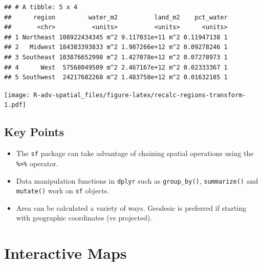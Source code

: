 \documentclass[]{book}
\newenvironment{Shaded}{\begin{snugshade}}{\end{snugshade}}
\newcommand{\KeywordTok}[1]{\textcolor[rgb]{0.13,0.29,0.53}{\textbf{{#1}}}}
\newcommand{\DataTypeTok}[1]{\textcolor[rgb]{0.13,0.29,0.53}{{#1}}}
\newcommand{\StringTok}[1]{\textcolor[rgb]{0.31,0.60,0.02}{{#1}}}
\newcommand{\CommentTok}[1]{\textcolor[rgb]{0.56,0.35,0.01}{\textit{{#1}}}}
\newcommand{\NormalTok}[1]{{#1}}
\providecommand{\tightlist}{%
  \setlength{\itemsep}{0pt}\setlength{\parskip}{0pt}}
\theoremstyle{definition}
\theoremstyle{definition}
\theoremstyle{definition}
\theoremstyle{remark}
\begin{document}
\begin{verbatim}
## # A tibble: 5 x 4
##      region         water_m2          land_m2    pct_water
##       <chr>          <units>          <units>      <units>
## 1 Northeast 108922434345 m^2 9.117031e+11 m^2 0.11947138 1
## 2   Midwest 184383393833 m^2 1.987266e+12 m^2 0.09278246 1
## 3 Southeast 103876652998 m^2 1.427078e+12 m^2 0.07278973 1
## 4      West  57568049509 m^2 2.467167e+12 m^2 0.02333367 1
## 5 Southwest  24217682268 m^2 1.483758e+12 m^2 0.01632185 1
\end{verbatim}

\begin{Shaded}
\end{Shaded}

\texttt{[image: R-adv-spatial\_files/figure-latex/recalc-regions-transform-1.pdf]}

\section{Key Points}\label{key-points}

\begin{itemize}
\tightlist
\item
  The \texttt{sf} package can take advantage of chaining spatial
  operations using the \texttt{\%\textgreater{}\%} operator.
\item
  Data manipulation functions in \texttt{dplyr} such as
  \texttt{group\_by()}, \texttt{summarize()} and \texttt{mutate()} work
  on \texttt{sf} objects.
\item
  Area can be calculated a variety of ways. Geodesic is preferred if
  starting with geographic coordinates (vs projected).
\end{itemize}

\chapter{Interactive Maps}\label{interactive}
\end{document}
